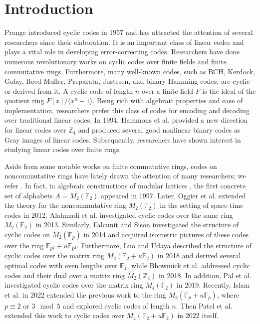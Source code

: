 \documentclass{amsart}
\theoremstyle{definition}
\theoremstyle{remark}
\numberwithin{equation}{section}
\begin{document}

    \maketitle
   \section{Introduction}
    
    Prange \cite{Pron} introduced cyclic codes  in $1957$ and has attracted the attention of several researchers since their elaboration. It is an important class of linear codes and plays a vital role in developing error-correcting codes. Researchers have done numerous revolutionary works on cyclic codes over finite fields and finite commutative rings. Furthermore, many well-known codes, such as BCH, Kerdock, Golay, Reed-Muller, Preparata, Justesen, and binary Hamming codes, are cyclic or derived from it. A cyclic code of length $n$ over a finite field $F$ is the ideal of the quotient ring $F[x]/\langle x^n-1 \rangle$. Being rich with algebraic properties and ease of implementation, researchers prefer this class of codes for encoding and decoding over traditional linear codes. In 1994, Hammons et al. \cite{ss} provided a new direction for linear codes over $\mathbb{Z}_4$ and produced several good nonlinear binary codes as Gray images of linear codes. Subsequently, researchers have shown interest in studying linear codes over finite rings.
 
    
    Aside from some notable works on finite commutative rings, codes on noncommutative rings have lately drawn the attention of many researchers; we refer \cite{Alah,G,Luo,F,Pal,W}. In fact, in algebraic constructions of modular lattices \cite{C}, the first concrete set of alphabets $A = M_2(\mathbb{F}_2)$ appeared in 1997. Later, Oggier et al. \cite{F} extended the theory for the noncommutative ring $M_2(\mathbb{F}_2)$ in the setting of space-time codes in 2012. Alahmadi et al. \cite{Alah} investigated cyclic codes over the same ring $M_2(\mathbb{F}_2)$ in 2013. Similarly, Falcunit and Sison \cite{Fal} investigated the structure of cyclic codes on $M_2(\mathbb{F}_p)$ in 2014 and acquired isometric pictures of these codes over the ring $\mathbb{F}_{p^2} + u\mathbb{F}_{p^2}$. Furthermore, Luo and Udaya \cite{Luo} described the structure of cyclic codes over the matrix ring $M_2(\mathbb{F}_2 + u\mathbb{F}_2)$ in 2018 and derived several optimal codes with even lengths over $\mathbb{F}_4$, while Bhowmick et al. \cite{Bandi} addressed cyclic codes and their dual over a matrix ring $M_2(\mathbb{Z}_4)$ in 2018. In addition, Pal et al. \cite{Pal} investigated cyclic codes over the matrix ring $M_4(\mathbb{F}_2)$ in 2019. Recently, Islam et al. \cite{Islam21b} in 2022 extended the previous work to the ring $M_2(\mathbb{F}_p + u\mathbb{F}_p)$, where $p \equiv 2$ or $3 \mod 5$ and explored cyclic codes of length $n$. Then Patel et al. \cite{s} extended this work to cyclic codes over $M_4(\mathbb{F}_{2} + u\mathbb{F}_{2})$ in 2022 itself.
\end{document}
